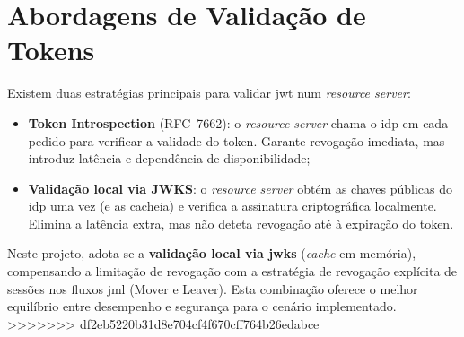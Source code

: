 \section{Abordagens de Validação de Tokens}

Existem duas estratégias principais para validar \gls{jwt} num \textit{resource server}:

\begin{itemize}
  \item \textbf{Token Introspection} (RFC~7662): o \textit{resource server} chama o \gls{idp} em cada pedido para verificar a validade do token. Garante revogação imediata, mas introduz latência e dependência de disponibilidade;
  \item \textbf{Validação local via JWKS}: o \textit{resource server} obtém as chaves públicas do \gls{idp} uma vez (e as cacheia) e verifica a assinatura criptográfica localmente. Elimina a latência extra, mas não deteta revogação até à expiração do token.
\end{itemize}

Neste projeto, adota-se a \textbf{validação local via \gls{jwks}} (\textit{cache} em memória), compensando a limitação de revogação com a estratégia de revogação explícita de sessões nos fluxos \gls{jml} (Mover e Leaver). Esta combinação oferece o melhor equilíbrio entre desempenho e segurança para o cenário implementado.
>>>>>>> df2eb5220b31d8e704cf4f670cff764b26edabce
